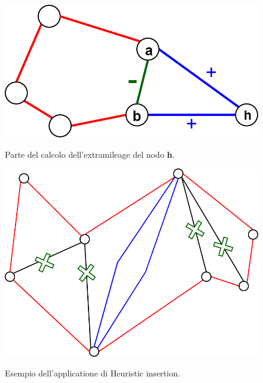 \begin{figure}[h] 
\begin{center} 
  \includegraphics[scale=0.2]{Images/partial_cycle}\\ 
  \caption{\footnotesize{Parte del calcolo dell'extramileage del nodo \textbf{h}.}}
  \label{partial_cycle}
\end{center}
\end{figure}
\begin{figure}[h] 
\begin{center} 
  \includegraphics[scale=0.4]{Images/insertion}\\ 
  \caption{\footnotesize{Esempio dell'applicatione di Heuristic insertion.}}
  \label{partial_cycle}
\end{center}
\end{figure}